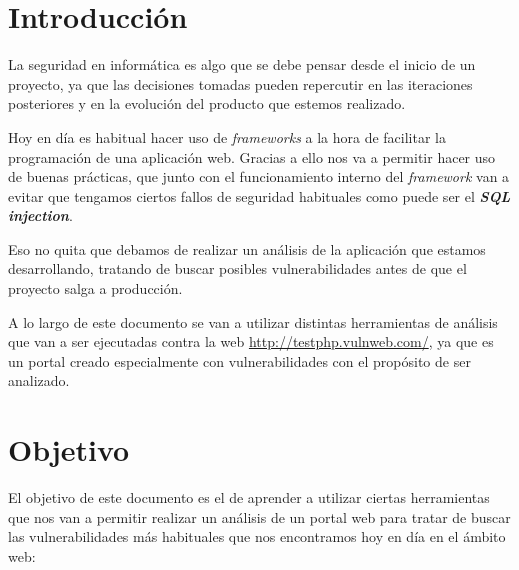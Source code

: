 \documentclass{\ClassPath/viu-tfm-template}
\begin{document}
\graphicspath{{../VIU_TFM_LaTeX_template/}}

\coverpage

\tableofcontents

\chapter{Introducción}

La seguridad en informática es algo que se debe pensar desde el inicio de un proyecto, ya que las decisiones tomadas pueden repercutir en las iteraciones posteriores y en la evolución del producto que estemos realizado.

Hoy en día es habitual hacer uso de \textit{frameworks} a la hora de facilitar la programación de una aplicación web. Gracias a ello nos va a permitir hacer uso de buenas prácticas, que junto con el funcionamiento interno del \textit{framework} van a evitar que tengamos ciertos fallos de seguridad habituales como puede ser el \textbf{\textit{SQL injection}}.

Eso no quita que debamos de realizar un análisis de la aplicación que estamos desarrollando, tratando de buscar posibles vulnerabilidades antes de que el proyecto salga a producción.

A lo largo de este documento se van a utilizar distintas herramientas de análisis que van a ser ejecutadas contra la web \href{http://testphp.vulnweb.com/}{http://testphp.vulnweb.com/}, ya que es un portal creado especialmente con vulnerabilidades con el propósito de ser analizado.


\chapter{Objetivo}
El objetivo de este documento es el de aprender a utilizar ciertas herramientas que nos van a permitir realizar un análisis de un portal web para tratar de buscar las vulnerabilidades más habituales que nos encontramos hoy en día en el ámbito web:
\end{document}
